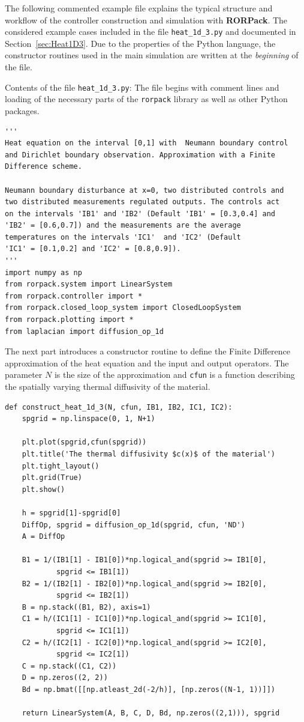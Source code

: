 \documentclass[11pt, a4paper]{amsart}
\theoremstyle{definition}
\numberwithin{equation}{section}
\newcommand{\RORname}{\textbf{RORPack}}
\begin{document}
The following commented example file explains the typical structure and workflow of the controller construction and simulation with \RORname. The considered example cases included in the file \texttt{heat\_1d\_3.py} and documented in Section~\ref{sec:Heat1D3}. Due to the properties of the Python language, the constructor routines used in the main simulation are written at the \textit{beginning}  of the file.

Contents of the file \texttt{heat\_1d\_3.py}: The file begins with comment lines and loading of the necessary parts of the \texttt{rorpack} library as well as other Python packages.

\begin{lstlisting}
'''
Heat equation on the interval [0,1] with  Neumann boundary control
and Dirichlet boundary observation. Approximation with a Finite 
Difference scheme.

Neumann boundary disturbance at x=0, two distributed controls and
two distributed measurements regulated outputs. The controls act 
on the intervals 'IB1' and 'IB2' (Default 'IB1' = [0.3,0.4] and 
'IB2' = [0.6,0.7]) and the measurements are the average 
temperatures on the intervals 'IC1'  and 'IC2' (Default 
'IC1' = [0.1,0.2] and 'IC2' = [0.8,0.9]).
'''
import numpy as np
from rorpack.system import LinearSystem
from rorpack.controller import *
from rorpack.closed_loop_system import ClosedLoopSystem
from rorpack.plotting import *
from laplacian import diffusion_op_1d
\end{lstlisting}

The next part introduces a constructor routine to define the Finite Difference approximation of the heat equation and the input and output operators. The parameter $N$ is the size of the approximation and \texttt{cfun} is a function describing the spatially varying thermal diffusivity of the material.

\begin{lstlisting}
def construct_heat_1d_3(N, cfun, IB1, IB2, IC1, IC2):
    spgrid = np.linspace(0, 1, N+1)

    plt.plot(spgrid,cfun(spgrid))
    plt.title('The thermal diffusivity $c(x)$ of the material')
    plt.tight_layout()
    plt.grid(True)
    plt.show()

    h = spgrid[1]-spgrid[0]
    DiffOp, spgrid = diffusion_op_1d(spgrid, cfun, 'ND')
    A = DiffOp

    B1 = 1/(IB1[1] - IB1[0])*np.logical_and(spgrid >= IB1[0], 
            spgrid <= IB1[1])
    B2 = 1/(IB2[1] - IB2[0])*np.logical_and(spgrid >= IB2[0],
            spgrid <= IB2[1])
    B = np.stack((B1, B2), axis=1)
    C1 = h/(IC1[1] - IC1[0])*np.logical_and(spgrid >= IC1[0],
            spgrid <= IC1[1])
    C2 = h/(IC2[1] - IC2[0])*np.logical_and(spgrid >= IC2[0],
            spgrid <= IC2[1])
    C = np.stack((C1, C2))
    D = np.zeros((2, 2))
    Bd = np.bmat([[np.atleast_2d(-2/h)], [np.zeros((N-1, 1))]])

    return LinearSystem(A, B, C, D, Bd, np.zeros((2,1))), spgrid
 \end{lstlisting}
\end{document}
